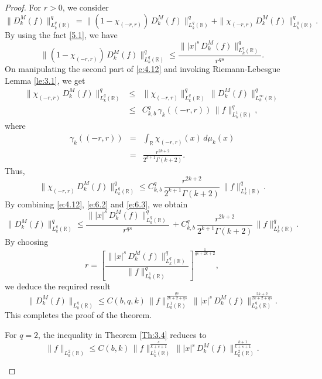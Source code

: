 \documentclass[10pt,a4paper]{amsart}
\begin{document}
 \begin{proof}
    For  $r>0$, we consider
 \begin{equation} \label{e:4.12}
 \|D_k^M(f)\|^q_{L_k^{q}(\mathbb{R})} =    \|\left(1-\chi_{(-r,r)}\right) \, D_k^M(f)\|^{q}_{L_k^{q}(\mathbb{R})}+ \|\chi_{(-r,r)}\, D_k^M(f)\|^{q}_{L_k^{q}(\mathbb{R})}.   
 \end{equation}
By using the fact \eqref{5.1}, we have
 \begin{equation}\label{e:6.2}
 \|\left(1-\chi_{(-r,r)}\right) \, D_k^M(f)\|^{q}_{L_k^{q}(\mathbb{R})}\le \frac{\||x|^s\, D_k^M(f)\|^{q}_{L_k^{q}(\mathbb{R})}}{r^{qs}}.   
 \end{equation}
 On manipulating the second part of \eqref{e:4.12} and invoking
 Riemann-Lebesgue Lemma \ref{le:3.1}, we get
\begin{eqnarray*}
    \|\chi_{(-r,r)}\, D_k^M(f)\|^{q}_{L_k^{q}(\mathbb{R})} &\le& \|\chi_{(-r,r)}\|^{q}_{L_k^{q}(\mathbb{R})}\, \|D_k^M(f)\|^q_{L^\infty_k(\mathbb{R})} \\
    &\le&C_{k,b}^{q}\,\gamma_k\left((-r,r)\right)\,  \|f\|^{q}_{L_k^1(\mathbb{R})},
\end{eqnarray*}
where
\begin{eqnarray} \label{5.9}
\nonumber\gamma_k\left((-r,r)\right) &= &\int_{\mathbb{R}}  \chi_{(-r,r)}(x)\, d\mu_k(x)\\ 
&=& \frac{r^{2k+2}}{2^{k+1}\Gamma(k+2)}.
\end{eqnarray}
Thus, 
\begin{equation}\label{e:6.3}
    \|\chi_{(-r,r)}\,D_k^M(f)\|_{L^{q}_k(\mathbb{R})}^{q} \le C_{k,b}^{q}\,  \frac{r^{2k+2}}{2^{k+1}\Gamma(k+2)}\,\|f\|^{q}_{L_k^1(\mathbb{R})}.
\end{equation}
By combining  \eqref{e:4.12}, \eqref{e:6.2} and \eqref{e:6.3}, we obtain
\begin{equation*}
 \|D_k^M(f)\|_{L_k^{q}(\mathbb{R})}^{q} \le \frac{\||x|^s\, D_k^M(f)\|^{q}_{L_k^{q}(\mathbb{R})}}{r^{qs}}  \,  +  C_{k,b}^{q}\,  \frac{r^{2k+2}}{2^{k+1}\Gamma(k+2)}\,\|f\|^{q}_{L_k^1(\mathbb{R})}. 
\end{equation*}
By choosing $$r= \left[\frac{\||x|^s\, D_k^M(f)\|^{q}_{L_k^{q}(\mathbb{R})} }{\|f\|^{q}_{L_k^1(\mathbb{R})}}\right]^{\frac{1}{qs+2k+2}},$$ we deduce the required result
\begin{equation*}
    \|D_k^M(f)\|_{L_k^{q}(\mathbb{R})}\le C(b,q,k)\, \|f\|_{L_k^1(\mathbb{R})}^{\frac{qs}{2k+2+qs}}\, \||x|^s\, D_k^M(f)\|_{L_k^{q}(\mathbb{R})}^{\frac{2k+2}{2k+2+qs}}.
\end{equation*}
This completes the proof of the theorem.
\begin{remark}
    For $q=2$, the inequality in Theorem \ref{Th:3.4} reduces to \begin{equation*}
    \|f\|_{L_k^{2}(\mathbb{R})}\le C(b,k)\, \|f\|_{L_k^1(\mathbb{R})}^{\frac{s}{k+s+1}}\, \||x|^s\, D_k^M(f)\|_{L_k^{2}(\mathbb{R})}^{\frac{k+1}{k+s+1}}.
\end{equation*} 
\end{remark}



\end{proof}
\end{document}
